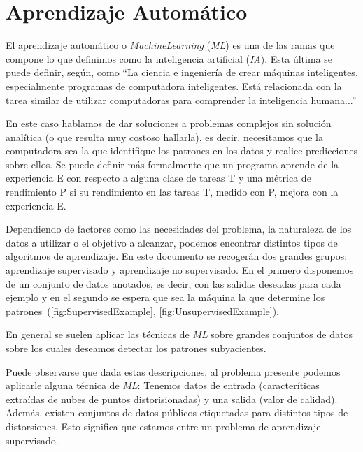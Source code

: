 \section{Aprendizaje Automático}
El aprendizaje automático\cite{IAModernApproach} o \emph{MachineLearning} (\emph{ML}) 
es una de las ramas que compone lo que definimos como 
la inteligencia artificial (\emph{IA}). Esta última se puede definir, 
según\cite{WhatIsAI}, como 
``La ciencia e ingeniería 
de crear máquinas inteligentes, especialmente programas de computadora inteligentes. 
Está relacionada con la tarea similar de utilizar computadoras para comprender 
la inteligencia humana...''

En este caso hablamos de dar soluciones a problemas complejos sin 
solución analítica (o que resulta muy costoso hallarla), es decir, necesitamos que la computadora sea la que identifique
los patrones en los datos y realice predicciones sobre ellos\cite{LearningFromData}.
Se puede definir más formalmente que un programa aprende de la experiencia E con
respecto a alguna clase de tareas T y una métrica de rendimiento P si su
rendimiento en las tareas T, medido con P, mejora con la experiencia E\cite{TomMitchell}.

Dependiendo de factores como las necesidades del problema, la naturaleza
de los datos a utilizar o el objetivo a alcanzar, podemos encontrar distintos tipos de
algoritmos de aprendizaje. En este documento se recogerán dos grandes grupos: aprendizaje supervisado 
y aprendizaje no supervisado. En el primero disponemos de un conjunto de datos 
anotados, es decir, con las salidas deseadas para cada ejemplo y en el segundo 
se espera que sea la máquina la que determine los patrones~(\ref{fig:SupervisedExample}, \ref{fig:UnsupervisedExample}). 

En general se suelen aplicar las técnicas de \emph{ML} sobre grandes conjuntos 
de datos sobre los cuales deseamos detectar los patrones subyacientes\cite{
DataMiningHandbook}.

Puede observarse que dada estas descripciones, al problema presente podemos 
aplicarle alguna técnica de \emph{ML}: Tenemos datos de entrada (caracteríticas 
extraídas de nubes de puntos distorisionadas) y una salida (valor de calidad). Además, existen conjuntos de 
datos públicos etiquetadas para distintos tipos de distorsiones. Esto significa que
estamos entre un problema de aprendizaje supervisado.

